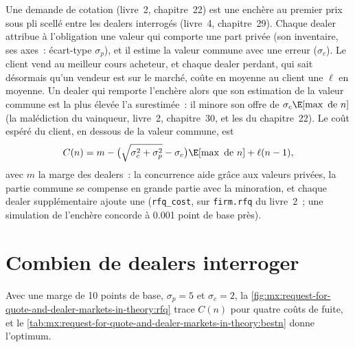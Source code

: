 Une demande de cotation (livre~2, chapitre~22) est une enchère au premier prix sous pli scellé entre les dealers interrogés (livre~4, chapitre~29). Chaque
dealer attribue à l'obligation une valeur qui comporte une part privée (son inventaire, ses axes~: écart-type $\sigma_p$), et il estime la valeur commune avec une
erreur ($\sigma_c$). Le client vend au meilleur cours acheteur, et chaque dealer perdant, qui sait désormais qu'un vendeur est sur le marché, coûte en moyenne au client une  $\ell$
en moyenne. Un dealer qui remporte l'enchère alors que son estimation de la valeur commune est la plus élevée l'a surestimée~: il minore son offre de $\sigma_c\E[\max\text{ de
}n]$ (la malédiction du vainqueur, livre~2, chapitre~30, et les  du chapitre~22). Le coût espéré du client, en dessous de la valeur commune, est
\[
C(n)=m-\bigl(\sqrt{\sigma_c^2+\sigma_p^2}-\sigma_c\bigr)\E[\max\text{ de }n]+\ell(n-1),
\]
avec $m$ la marge des dealers~: la concurrence aide grâce aux valeurs privées, la partie commune se compense en grande partie avec la minoration, et chaque dealer supplémentaire
ajoute une  (\texttt{rfq\_cost}, sur \texttt{firm.rfq} du livre~2~; une simulation de l'enchère concorde à 0.001 point de base près).

\label{lst:mx:request-for-quote-and-dealer-markets-in-theory:rfq}

\section{Combien de dealers interroger}

Avec une marge de 10 points de base, $\sigma_p=5$ et $\sigma_c=2$, la \cref{fig:mx:request-for-quote-and-dealer-markets-in-theory:rfq} trace $C(n)$ pour
quatre coûts de fuite, et le \cref{tab:mx:request-for-quote-and-dealer-markets-in-theory:bestn} donne l'optimum.

